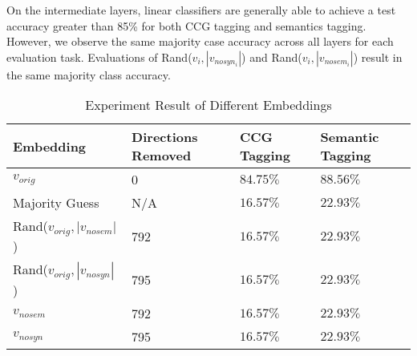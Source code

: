 \documentclass[11pt,a4paper]{article}
\begin{document}
On the intermediate layers, linear classifiers are generally able to achieve a test accuracy greater than 85\% for both CCG tagging and semantics tagging. However, we observe the same majority case accuracy across all layers for each evaluation task. Evaluations of Rand($v_i, |v_{nosyn_i}|$) and Rand($v_i, |v_{nosem_i}|$) result in the same majority class accuracy.

\begin{table*}[h]
    \centering
    \begin{tabular}{llll}
    \hline
    \textbf{Embedding} & \textbf{Directions Removed} & \textbf{CCG Tagging} &\textbf{Semantic Tagging} \\
    \hline
    $v_{orig}$ & 0 & $84.75\%$ & $88.56\%$ \\
    \hline
    Majority Guess & N/A&$16.57\%$  &$22.93\%$ \\ \hline
    Rand($v_{orig}, |v_{nosem}|$) & 792 & $16.57\%$ & $22.93\%$ \\
    Rand($v_{orig}, |v_{nosyn}|$) & 795 & $16.57\%$ & $22.93\%$ \\
    \hline
    $v_{nosem}$ & 792 & $16.57\%$ & $22.93\%$ \\
    $v_{nosyn}$ & 795 & $16.57\%$ & $22.93\%$ \\
    \hline
    \hline
    \end{tabular}
    \caption{\label{role description} Experiment Result of Different Embeddings
    }
    \end{table*}
\end{document}
